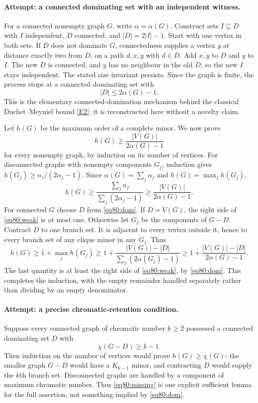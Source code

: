\documentclass[11pt,a4paper]{article}
\numberwithin{equation}{section}
\newcommand{\eref}[2]{\hyperlink{extra:#1:#2}{[E#2]}}
\begin{document}
\paragraph{Attempt: a connected dominating set with an independent witness.}
For a connected nonempty graph $G$, write $\alpha=\alpha(G)$. Construct
sets $I\subseteq D$ with $I$ independent, $D$ connected, and
$|D|=2|I|-1$. Start with one vertex in both sets. If $D$ does not dominate
$G$, connectedness supplies a vertex $y$ at distance exactly two from
$D$, on a path $d,x,y$ with $d\in D$. Add $x,y$ to $D$ and $y$ to $I$.
The new $D$ is connected, and $y$ has no neighbour in the old $D$, so the
new $I$ stays independent. The stated size invariant persists. Since the
graph is finite, the process stops at a connected dominating set with
\begin{equation}\label{eq80:dom}
 |D|\leq2\alpha(G)-1.
\end{equation}
This is the elementary connected-domination mechanism behind the classical
Duchet--Meyniel bound \eref{14}{2}; it is reconstructed here without a
novelty claim.

Let $h(G)$ be the maximum order of a complete minor. We now prove
\begin{equation}\label{eq80:weak}
 h(G)\geq\frac{|V(G)|}{2\alpha(G)-1}
\end{equation}
for every nonempty graph, by induction on its number of vertices.
For disconnected graphs with nonempty components $G_j$, induction gives
$h(G_j)\geq n_j/(2\alpha_j-1)$. Since
$\alpha(G)=\sum_j\alpha_j$ and $h(G)=\max_jh(G_j)$,
\[
 h(G)\geq\frac{\sum_j n_j}{\sum_j(2\alpha_j-1)}
       \geq\frac{|V(G)|}{2\alpha(G)-1}.
\]
For connected $G$ choose $D$ from \eqref{eq80:dom}. If $D=V(G)$, the
right side of \eqref{eq80:weak} is at most one. Otherwise let $G_j$ be
the components of $G-D$. Contract $D$ to one branch set. It is adjacent
to every vertex outside it, hence to every branch set of any clique minor
in any $G_j$. Thus
\[
 h(G)\geq1+\max_jh(G_j)
 \geq1+\frac{|V(G)|-|D|}{\sum_j(2\alpha(G_j)-1)}
 \geq1+\frac{|V(G)|-|D|}{2\alpha(G)-1}.
\]
The last quantity is at least the right side of \eqref{eq80:weak}, by
\eqref{eq80:dom}. This completes the induction, with the empty remainder
handled separately rather than dividing by an empty denominator.

\paragraph{Attempt: a precise chromatic-retention condition.}
Suppose every connected graph of chromatic number $k\geq2$ possessed a
connected dominating set $D$ with
\begin{equation}\label{eq80:missing}
 \chi(G-D)\geq k-1.
\end{equation}
Then induction on the number of vertices would prove $h(G)\geq\chi(G)$:
the smaller graph $G-D$ would have a $K_{k-1}$ minor, and contracting $D$
would supply the $k$th branch set. Disconnected graphs are handled by a
component of maximum chromatic number. Thus \eqref{eq80:missing} is one
explicit sufficient lemma for the full assertion, not something implied
by \eqref{eq80:dom}.
\end{document}
